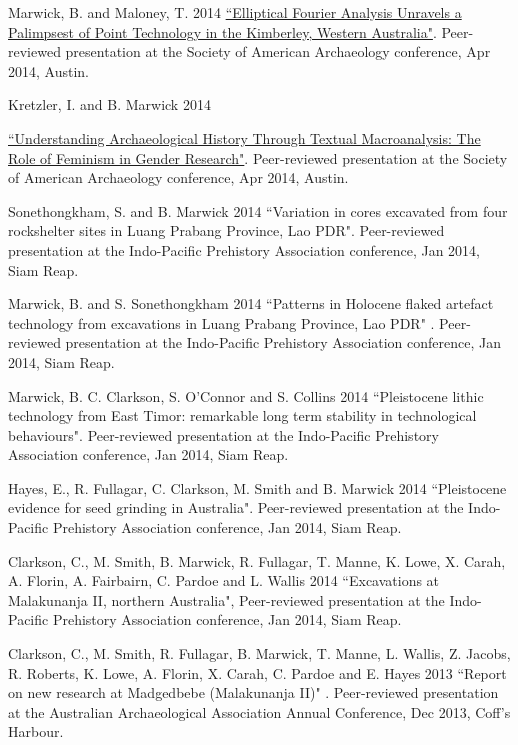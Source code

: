 \medskip

\ind Marwick, B. and Maloney, T. 2014 {\href{"https://github.com/benmarwick/marwick-and-maloney-saa2014}{``Elliptical Fourier Analysis Unravels a Palimpsest of Point Technology  in the Kimberley, Western Australia"}}. Peer-reviewed presentation at the Society of American Archaeology conference, Apr 2014, Austin.

\ind Kretzler, I. and B. Marwick 2014 {\href{https://github.com/benmarwick/kretzler-and-marwick-saa2014}{``Understanding Archaeological History Through Textual Macroanalysis: The Role of Feminism in Gender Research"}. Peer-reviewed presentation at the Society of American Archaeology conference, Apr 2014, Austin.

\ind Sonethongkham, S. and B. Marwick 2014 ``Variation in cores excavated from four rockshelter sites in Luang Prabang Province, Lao PDR". Peer-reviewed presentation at the Indo-Pacific Prehistory Association conference, Jan 2014, Siam Reap.

\ind Marwick, B.  and S. Sonethongkham 2014 ``Patterns in Holocene flaked artefact technology from excavations in Luang Prabang Province, Lao PDR" . Peer-reviewed presentation at the Indo-Pacific Prehistory Association conference, Jan 2014, Siam Reap.

\ind Marwick, B. C. Clarkson, S. O’Connor and S. Collins 2014 ``Pleistocene lithic technology from East Timor: remarkable long term stability in technological behaviours". Peer-reviewed presentation at the Indo-Pacific Prehistory Association conference, Jan 2014, Siam Reap.

\ind Hayes, E., R. Fullagar, C. Clarkson, M. Smith and B. Marwick 2014 ``Pleistocene evidence for seed grinding in Australia". Peer-reviewed presentation at the Indo-Pacific Prehistory Association conference, Jan 2014, Siam Reap.

\ind Clarkson, C., M. Smith, B. Marwick, R. Fullagar, T. Manne, K. Lowe, X. Carah,  A. Florin, A.  Fairbairn, C. Pardoe and L. Wallis 2014 ``Excavations at Malakunanja II, northern Australia",  Peer-reviewed presentation at the Indo-Pacific Prehistory Association conference, Jan 2014, Siam Reap.

\ind Clarkson, C., M. Smith, R. Fullagar, B. Marwick, T. Manne, L. Wallis, Z. Jacobs, R. Roberts, K. Lowe, A. Florin, X. Carah, C. Pardoe and E. Hayes 2013 ``Report on new research at Madgedbebe (Malakunanja II)" . Peer-reviewed presentation at the Australian Archaeological Association Annual Conference, Dec 2013, Coff’s Harbour. 

}
